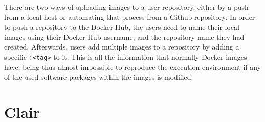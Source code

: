 There are two ways of uploading images to a user repository, either by a push from a local host or automating that process from a Github repository. In order to push a repository to the Docker Hub, the users need to name their local images using their Docker Hub username, and the repository name they had created. Afterwards, users add multiple images to a repository by adding a specific \texttt{:<tag>} to it. This is all the information that normally Docker images have, being thus almost impossible to reproduce the execution environment if any of the used software packages within the images is modified. 

\section{Clair}